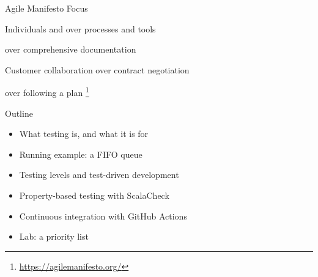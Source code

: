\begin{frame}{Agile Manifesto Focus}

\begin{centering}

	Individuals and   over processes and tools
	\vspace{1em}

	 over comprehensive documentation
	\vspace{1em}

	Customer collaboration over contract negotiation
	\vspace{1em}

	 over following a plan \footnote{\href{https://agilemanifesto.org/}{https://agilemanifesto.org/}}

\end{centering}

\end{frame}

\begin{frame}{Outline}
	\begin{itemize}
		\item What testing is, and what it is for
		\item Running example: a FIFO queue
		\item Testing levels and test-driven development
		\item Property-based testing with ScalaCheck
		\item Continuous integration with GitHub Actions
		\item Lab: a priority list
	\end{itemize}
\end{frame}

